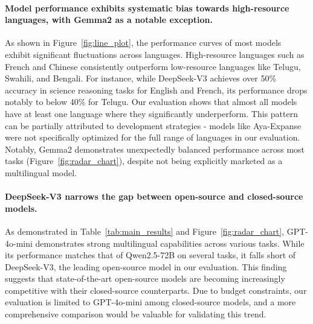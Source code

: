 \paragraph{Model performance exhibits systematic bias towards high-resource languages, with Gemma2 as a notable exception.}
As shown in Figure~\ref{fig:line_plot}, the performance curves of most models exhibit significant fluctuations across languages.
High-resource languages such as French and Chinese consistently outperform low-resource languages like Telugu, Swahili, and Bengali.
For instance, while DeepSeek-V3 achieves over 50\% accuracy in science reasoning tasks for English and French, its performance drops notably to below 40\% for Telugu.
Our evaluation shows that almost all models have at least one language where they significantly underperform.
This pattern can be partially attributed to development strategies - models like Aya-Expanse were not specifically optimized for the full range of languages in our evaluation.
Notably, Gemma2 demonstrates unexpectedly balanced performance across most tasks (Figure~\ref{fig:radar_chart}), despite not being explicitly marketed as a multilingual model.


\paragraph{DeepSeek-V3 narrows the gap between open-source and closed-source models.}
As demonstrated in Table~\ref{tab:main_results} and Figure~\ref{fig:radar_chart}, GPT-4o-mini demonstrates strong multilingual capabilities across various tasks.
While its performance matches that of Qwen2.5-72B on several tasks, it falls short of DeepSeek-V3, the leading open-source model in our evaluation.
This finding suggests that state-of-the-art open-source models are becoming increasingly competitive with their closed-source counterparts.
Due to budget constraints, our evaluation is limited to GPT-4o-mini among closed-source models, and a more comprehensive comparison would be valuable for validating this trend.


